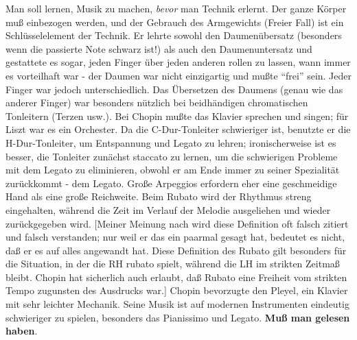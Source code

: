 Man soll lernen, Musik zu machen, \textit{bevor} man Technik erlernt.
Der ganze Körper muß einbezogen werden, und der Gebrauch des Armgewichts (Freier Fall) ist ein Schlüsselelement der Technik.
Er lehrte sowohl den Daumenübersatz (besonders wenn die passierte Note schwarz ist!) als auch den Daumenuntersatz und gestattete es sogar, jeden Finger über jeden anderen rollen zu lassen, wann immer es vorteilhaft war - der Daumen war nicht einzigartig und mußte \enquote{frei} sein.
Jeder Finger war jedoch unterschiedlich.
Das Übersetzen des Daumens (genau wie das anderer Finger) war besonders nützlich bei beidhändigen chromatischen Tonleitern (Terzen usw.).
Bei Chopin mußte das Klavier sprechen und singen; für Liszt war es ein Orchester.
Da die C-Dur-Tonleiter schwieriger ist, benutzte er die H-Dur-Tonleiter, um Entspannung und Legato zu lehren; ironischerweise ist es besser, die Tonleiter zunächst staccato zu lernen, um die schwierigen Probleme mit dem Legato zu eliminieren, obwohl er am Ende immer zu seiner Spezialität zurückkommt - dem Legato.
Große Arpeggios erfordern eher eine geschmeidige Hand als eine große Reichweite.
Beim Rubato wird der Rhythmus streng eingehalten, während die Zeit im Verlauf der Melodie ausgeliehen und wieder zurückgegeben wird.
[Meiner Meinung nach wird diese Definition oft falsch zitiert und falsch verstanden; nur weil er das ein paarmal gesagt hat, bedeutet es nicht, daß er es auf alles angewandt hat.
Diese Definition des Rubato gilt besonders für die Situation, in der die RH rubato spielt, während die LH im strikten Zeitmaß bleibt.
Chopin hat sicherlich auch erlaubt, daß Rubato eine Freiheit vom strikten Tempo zugunsten des Ausdrucks war.]
Chopin bevorzugte den Pleyel, ein Klavier mit sehr leichter Mechanik.
Seine Musik ist auf modernen Instrumenten eindeutig schwieriger zu spielen, besonders das Pianissimo und Legato.
\textbf{Muß man gelesen haben}.


\label{Fink}

